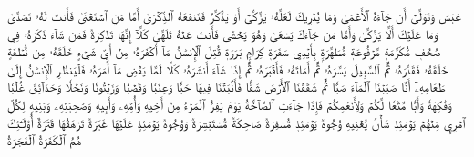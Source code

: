 عَبَسَ وَتَوَلَّىٰٓ
أَن جَآءَهُ ٱلۡأَعۡمَىٰ
وَمَا يُدۡرِيكَ لَعَلَّهُۥ يَزَّكَّىٰٓ
أَوۡ يَذَّكَّرُ فَتَنفَعَهُ ٱلذِّكۡرَىٰٓ
أَمَّا مَنِ ٱسۡتَغۡنَىٰ
فَأَنتَ لَهُۥ تَصَدَّىٰ
وَمَا عَلَيۡكَ أَلَّا يَزَّكَّىٰ
وَأَمَّا مَن جَآءَكَ يَسۡعَىٰ
وَهُوَ يَخۡشَىٰ
فَأَنتَ عَنۡهُ تَلَهَّىٰ
كَلَّآ إِنَّهَا تَذۡكِرَةٞ
فَمَن شَآءَ ذَكَرَهُۥ
فِي صُحُفٖ مُّكَرَّمَةٖ
مَّرۡفُوعَةٖ مُّطَهَّرَةِۭ
بِأَيۡدِي سَفَرَةٖ
كِرَامِۭ بَرَرَةٖ
قُتِلَ ٱلۡإِنسَٰنُ مَآ أَكۡفَرَهُۥ
مِنۡ أَيِّ شَيۡءٍ خَلَقَهُۥ
مِن نُّطۡفَةٍ خَلَقَهُۥ فَقَدَّرَهُۥ
ثُمَّ ٱلسَّبِيلَ يَسَّرَهُۥ
ثُمَّ أَمَاتَهُۥ فَأَقۡبَرَهُۥ
ثُمَّ إِذَا شَآءَ أَنشَرَهُۥ
كَلَّا لَمَّا يَقۡضِ مَآ أَمَرَهُۥ
فَلۡيَنظُرِ ٱلۡإِنسَٰنُ إِلَىٰ طَعَامِهِۦٓ
أَنَّا صَبَبۡنَا ٱلۡمَآءَ صَبّٗا
ثُمَّ شَقَقۡنَا ٱلۡأَرۡضَ شَقّٗا
فَأَنۢبَتۡنَا فِيهَا حَبّٗا
وَعِنَبٗا وَقَضۡبٗا
وَزَيۡتُونٗا وَنَخۡلٗا
وَحَدَآئِقَ غُلۡبٗا
وَفَٰكِهَةٗ وَأَبّٗا
مَّتَٰعٗا لَّكُمۡ وَلِأَنۡعَٰمِكُمۡ
فَإِذَا جَآءَتِ ٱلصَّآخَّةُ
يَوۡمَ يَفِرُّ ٱلۡمَرۡءُ مِنۡ أَخِيهِ
وَأُمِّهِۦ وَأَبِيهِ
وَصَٰحِبَتِهِۦ وَبَنِيهِ
لِكُلِّ ٱمۡرِيٕٖ مِّنۡهُمۡ يَوۡمَئِذٖ شَأۡنٞ يُغۡنِيهِ
وُجُوهٞ يَوۡمَئِذٖ مُّسۡفِرَةٞ
ضَاحِكَةٞ مُّسۡتَبۡشِرَةٞ
وَوُجُوهٞ يَوۡمَئِذٍ عَلَيۡهَا غَبَرَةٞ
تَرۡهَقُهَا قَتَرَةٌ
أُوْلَـٰٓئِكَ هُمُ ٱلۡكَفَرَةُ ٱلۡفَجَرَةُ